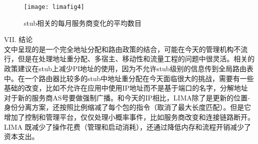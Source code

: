 \begin{figure}
  \centering
  \texttt{[image: limafig4]}\\
  \caption{stub相关的每月服务商变化的平均数目}\label{fig:limafig4}
\end{figure}


VII.	结论 \\
文中呈现的是一个完全地址分配和路由政策的结合，可能在今天的管理机构不流行，但是在处理地址重分配、多宿主、移动性和流量工程的问题中很灵活。相关的政策建议在stub上减少PI地址的使用，因为不允许stub级别的信息传到全局路由表中。在一个路由器比较多的stub中地址重分配在今天面临很大的挑战，需要有一些基础的改变，比如不允许在应用中使用IP地址而不是基于端口的名字，分解地址对于新的服务商AS号要做强制广播。和今天的IP相比，LIMA除了是更新的位置-身份分离方案，还按照比例缩减了每个包的指令（取消了最大长度匹配）。但是它增加了控制和管理平台，仅仅处理小概率事件，比如服务商改变和连接链路断开。LIMA 既减少了操作花费（管理和启动消耗），还通过降低内存和流程开销减少了资本支出。




